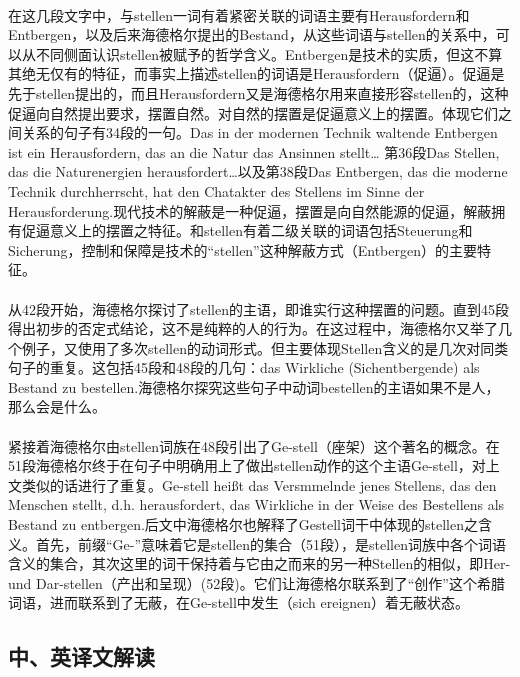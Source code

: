\documentclass{article}
\begin{document}
		\paragraph{}
		在这几段文字中，与stellen一词有着紧密关联的词语主要有Herausfordern和Entbergen，以及后来海德格尔提出的Bestand，从这些词语与stellen的关系中，可以从不同侧面认识stellen被赋予的哲学含义。Entbergen是技术的实质，但这不算其绝无仅有的特征，而事实上描述stellen的词语是Herausfordern（促逼）。促逼是先于stellen提出的，而且Herausfordern又是海德格尔用来直接形容stellen的，这种促逼向自然提出要求，摆置自然。对自然的摆置是促逼意义上的摆置。体现它们之间关系的句子有34段的一句。Das in der modernen Technik waltende Entbergen ist ein Herausfordern, das an die Natur das Ansinnen stellt… 第36段Das Stellen, das die Naturenergien herausfordert…以及第38段Das Entbergen, das die moderne Technik durchherrscht, hat den Chatakter des Stellens im Sinne der Herausforderung.现代技术的解蔽是一种促逼，摆置是向自然能源的促逼，解蔽拥有促逼意义上的摆置之特征。和stellen有着二级关联的词语包括Steuerung和Sicherung，控制和保障是技术的“stellen”这种解蔽方式（Entbergen）的主要特征。
		\paragraph{}
		从42段开始，海德格尔探讨了stellen的主语，即谁实行这种摆置的问题。直到45段得出初步的否定式结论，这不是纯粹的人的行为。在这过程中，海德格尔又举了几个例子，又使用了多次stellen的动词形式。但主要体现Stellen含义的是几次对同类句子的重复。这包括45段和48段的几句：das Wirkliche (Sichentbergende) als Bestand zu bestellen.海德格尔探究这些句子中动词bestellen的主语如果不是人，那么会是什么。
		\paragraph{}
		紧接着海德格尔由stellen词族在48段引出了Ge-stell（座架）这个著名的概念。在51段海德格尔终于在句子中明确用上了做出stellen动作的这个主语Ge-stell，对上文类似的话进行了重复。Ge-stell heißt das Versmmelnde jenes Stellens, das den Menschen stellt, d.h. herausfordert, das Wirkliche in der Weise des Bestellens als Bestand zu entbergen.后文中海德格尔也解释了Gestell词干中体现的stellen之含义。首先，前缀“Ge-”意味着它是stellen的集合（51段），是stellen词族中各个词语含义的集合，其次这里的词干保持着与它由之而来的另一种Stellen的相似，即Her- und Dar-stellen（产出和呈现）(52段)。它们让海德格尔联系到了“创作”这个希腊词语，进而联系到了无蔽，在Ge-stell中发生（sich ereignen）着无蔽状态。	
		
	\subsection{中、英译文解读}
\end{document}
